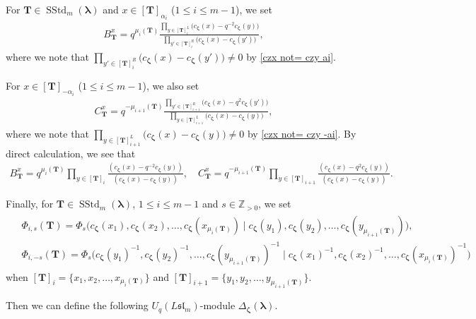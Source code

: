 \documentclass[12pt]{amsart}
\numberwithin{equation}{thm}
\newcommand\ZZ{\mathbb Z}
\newcommand\bT{\mathbf T}
\renewcommand\a{\alpha}  %
\newcommand\D{\Delta}
\newcommand\Bz{\boldsymbol\zeta}
\newcommand\Bla{\boldsymbol\lambda}
\newcommand\Fsl{\mathfrak{sl}}
\newcommand{\SStd}{\operatorname{SStd}}
\begin{document}
For $\bT \in \SStd_m(\Bla)$ and $x \in [\bT]_{\a_i}$ ($1 \leq i \leq m-1$), we set 
\begin{align*}
B_{\bT}^x = q^{\mu_i (\bT)} 
	\frac{ \prod_{ y \in [\bT]_i^L} \big( c_{\Bz} (x) - q^{-2} c_{\Bz} (y) \big)}
		{ \prod_{y' \in [\bT]_i^R} \big( c_{\Bz} (x) - c_{\Bz} (y') \big)}, 
\end{align*}
where we note that $\prod_{y' \in [\bT]_i^R} \big( c_{\Bz} (x) - c_{\Bz} (y') \big) \not=0$ by \eqref{czx not= czy ai}. 

For $x \in [\bT]_{-\a_i}$ ($1 \leq i \leq m-1$), we also set 
\begin{align*}
C_{\bT}^x = q^{- \mu_{i+1} (\bT)} 
	\frac{ \prod_{y' \in [\bT]_{i+1}^R} \big( c_{\Bz}(x) - q^2 c_{\Bz} (y') \big)}
		{ \prod_{ y \in [\bT]_{i+1}^L} \big( c_{\Bz} (x) - c_{\Bz} (y) \big)}, 
\end{align*}
where we note that $\prod_{ y \in [\bT]_{i+1}^L} \big( c_{\Bz} (x) - c_{\Bz} (y) \big) \not=0$ by \eqref{czx not= czy -ai}.
By direct calculation, we see that 
\begin{align}
\label{BbTx CbTx}
B_{\bT}^x = q^{\mu_i (\bT)} \prod_{y \in [\bT]_i} \frac{(c_{\Bz}(x) - q^{-2} c_{\Bz}(y))}{( c_{\Bz}(x) - c_{\Bz}(y))},  
\quad 
C_{\bT}^x = q^{-\mu_{i+1}(\bT)} \prod_{y \in [\bT]_{i+1}} \frac{ (c_{\Bz}(x) - q^2 c_{\Bz}(y))}{(c_{\Bz}(x) - c_{\Bz}(y))}. 
\end{align}


Finally, for $\bT \in \SStd_m (\Bla)$, $1 \leq i \leq m-1$ and $s \in \ZZ_{>0}$, 
we set 
\begin{align}
\label{def PhiisbT}
\begin{split}
&\Phi_{i,s} (\bT) = \Phi_s \big( c_{\Bz} (x_1), c_{\Bz} (x_2), \dots, c_{\Bz}(x_{\mu_i(\bT)}) 
	\mid c_{\Bz} (y_1), c_{\Bz} (y_2), \dots, c_{\Bz} (y_{\mu_{i+1}(\bT)}) \big), 
\\
& \Phi_{i,-s} (\bT) = \Phi_s \big( c_{\Bz} (y_1)^{-1}, c_{\Bz} (y_2)^{-1}, \dots, c_{\Bz} (y_{\mu_{i+1} (\bT)})^{-1} 
	\mid c_{\Bz} (x_1)^{-1}, c_{\Bz} (x_2)^{-1}, \dots, c_{\Bz} (x_{\mu_i(\bT)})^{-1}  \big)
\end{split}
\end{align} 
when $[\bT]_i =\{x_1,x_2,\dots, x_{\mu_i(\bT)}\}$ and $[\bT]_{i+1} = \{y_1,y_2,\dots, y_{\mu_{i+1}(\bT)}\}$. 

Then we can define the following $U_q (L\Fsl_m)$-module $\D_{\Bz} (\Bla)$. 
\end{document}
